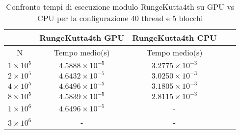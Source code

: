 \begin{table}[ht!]
    \begin{center}
        \renewcommand{\arraystretch}{1.5}
        \begin{adjustbox}{width=.51\textwidth}
            \begin{tabular}{ |c|c|c|c|c| }
                \hline
                \multicolumn{1}{|c}{} & \multicolumn{1}{|c}{RungeKutta4th GPU} & \multicolumn{1}{|c|}{RungeKutta4th CPU}\\
                \hline
                N & Tempo medio(s) & Tempo medio(s) \\
                \hline 
                $1 \times 10^5$ & $4.5888 \times 10^{-5}$ & $3.2775 \times 10^{-3}$ \\ 
                \hline 
                $2 \times 10^5$ & $4.6432 \times 10^{-5}$ & $3.0250 \times 10^{-3}$ \\ 
                \hline 
                $4 \times 10^5$ & $4.6496 \times 10^{-5}$ & $3.1805 \times 10^{-3}$ \\ 
                \hline
                $8 \times 10^5$ & $4.5839 \times 10^{-5}$ & $2.8115 \times 10^{-3}$ \\ 
                \hline 
                $1 \times 10^6$ & $4.6496 \times 10^{-5}$ & - \\ 
                \hline 
                $3 \times 10^6$ & - & -  \\ 
                \hline 
            \end{tabular}
        \end{adjustbox}
    \end{center}
    \caption{Confronto tempi di esecuzione modulo RungeKutta4th su GPU vs CPU per la configurazione 40 thread e 5 blocchi}
    \label{tab:rk4_kernel_table_40x5}
\end{table}

